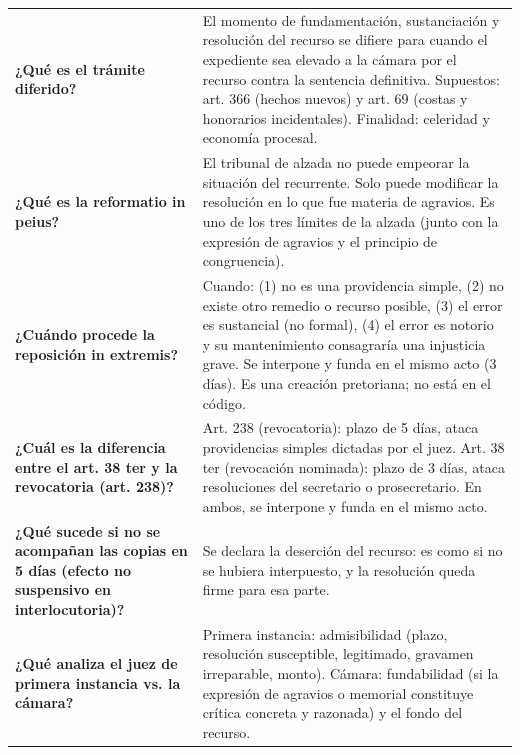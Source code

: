 \documentclass[12pt,oneside]{book}
\begin{document}
\begin{longtable}{
    >{\raggedright\arraybackslash}p{}
    >{\raggedright\arraybackslash}p{}
}
\textbf{¿Qué es el trámite diferido?} &
El momento de fundamentación, sustanciación y resolución del recurso se difiere para cuando el expediente sea elevado a la cámara por el recurso contra la sentencia definitiva. Supuestos: art. 366 (hechos nuevos) y art. 69 (costas y honorarios incidentales). Finalidad: celeridad y economía procesal. \\

\textbf{¿Qué es la reformatio in peius?} &
El tribunal de alzada no puede empeorar la situación del recurrente. Solo puede modificar la resolución en lo que fue materia de agravios. Es uno de los tres límites de la alzada (junto con la expresión de agravios y el principio de congruencia). \\

\textbf{¿Cuándo procede la reposición in extremis?} &
Cuando: (1) no es una providencia simple, (2) no existe otro remedio o recurso posible, (3) el error es sustancial (no formal), (4) el error es notorio y su mantenimiento consagraría una injusticia grave. Se interpone y funda en el mismo acto (3 días). Es una creación pretoriana; no está en el código. \\

\textbf{¿Cuál es la diferencia entre el art. 38 ter y la revocatoria (art. 238)?} &
Art. 238 (revocatoria): plazo de 5 días, ataca providencias simples dictadas por el juez. Art. 38 ter (revocación nominada): plazo de 3 días, ataca resoluciones del secretario o prosecretario. En ambos, se interpone y funda en el mismo acto. \\

\textbf{¿Qué sucede si no se acompañan las copias en 5 días (efecto no suspensivo en interlocutoria)?} &
Se declara la deserción del recurso: es como si no se hubiera interpuesto, y la resolución queda firme para esa parte. \\

\textbf{¿Qué analiza el juez de primera instancia vs. la cámara?} &
Primera instancia: admisibilidad (plazo, resolución susceptible, legitimado, gravamen irreparable, monto). Cámara: fundabilidad (si la expresión de agravios o memorial constituye crítica concreta y razonada) y el fondo del recurso. \\

\midrule


\end{longtable}
\end{document}
